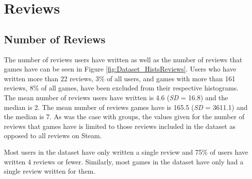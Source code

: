 \section{Reviews} \label{sec:Dataset_Reviews}

\subsection{Number of Reviews} \label{sec:Dataset_Reviews_NR}

The number of reviews users have written as well as the number of reviews that games have can be seen in Figure \ref{fig:Dataset_HistsReviews}. Users who have written more than 22 reviews, 3\% of all users, and games with more than 161 reviews, 8\% of all games, have been excluded from their respective histograms. The mean number of reviews users have written is 4.6 (\textit{SD} = 16.8) and the median is 2. The mean number of reviews games have is 165.5 (\textit{SD} = 3611.1) and the median is 7. As was the case with groups, the values given for the number of reviews that games have is limited to those reviews included in the dataset as opposed to all reviews on Steam.

Most users in the dataset have only written a single review and 75\% of users have written 4 reviews or fewer. Similarly, most games in the dataset have only had a single review written for them.

